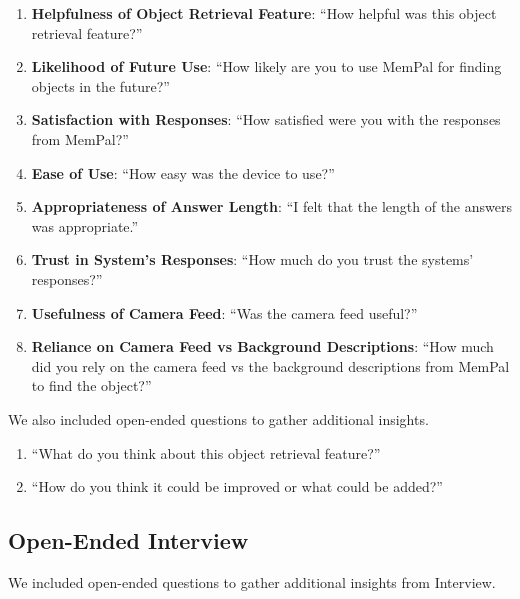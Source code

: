\begin{enumerate}
    \item \textbf{Helpfulness of Object Retrieval Feature}: ``How helpful was this object retrieval feature?''
    \item \textbf{Likelihood of Future Use}: ``How likely are you to use MemPal for finding objects in the future?''
    \item \textbf{Satisfaction with Responses}: ``How satisfied were you with the responses from MemPal?''
    \item \textbf{Ease of Use}: ``How easy was the device to use?''
    \item \textbf{Appropriateness of Answer Length}: ``I felt that the length of the answers was appropriate.''
    \item \textbf{Trust in System's Responses}: ``How much do you trust the systems’ responses?''
    \item \textbf{Usefulness of Camera Feed}: ``Was the camera feed useful?''
    \item \textbf{Reliance on Camera Feed vs Background Descriptions}: ``How much did you rely on the camera feed vs the background descriptions from MemPal to find the object?''
\end{enumerate}

We also included open-ended questions to gather additional insights.

\begin{enumerate}
    \item ``What do you think about this object retrieval feature?''
    \item ``How do you think it could be improved or what could be added?''
\end{enumerate}



\subsection{Open-Ended Interview}
\label{appendixOpenEndedInterview}
We included open-ended questions to gather additional insights from Interview.\label{secinterview}


